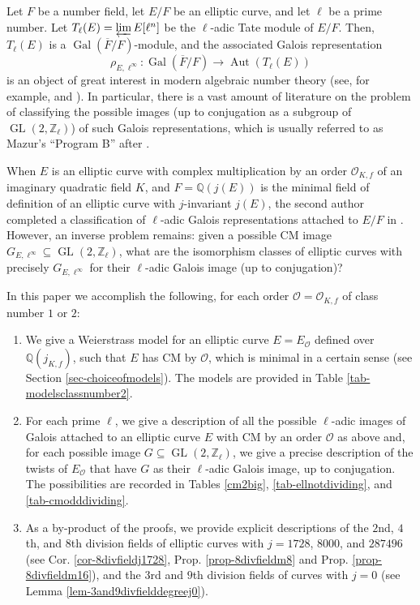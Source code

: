 \documentclass[11pt]{amsart}
\theoremstyle{definition}
\newcommand{\Q}{\mathbb Q}
\newcommand{\Z}{\mathbb Z}
\newcommand{\Gal}{\operatorname{Gal}}
\newcommand{\Aut}{\operatorname{Aut}}
\newcommand{\GL}{\operatorname{GL}}
\begin{document}
Let $F$ be a number field, let $E/F$ be an elliptic curve, and let $\ell$ be a prime number. Let $T_\ell(E)=\varprojlim E[\ell^n]$ be the $\ell$-adic Tate module of $E/F$. Then, $T_\ell(E)$ is a $\Gal(\overline{F}/F)$-module, and the associated Galois representation
$$\rho_{E,\ell^{\infty}}\colon \Gal(\overline{F}/F)\to \Aut(T_\ell(E))$$
is an object of great interest in modern algebraic number theory (see, for example, \cite{elladic} and \cite{zywina}). In particular,
there is a vast amount of literature on the problem of classifying the possible images (up to conjugation as a subgroup of $\GL(2,\Z_\ell)$) of such Galois representations, which is usually referred to as Mazur's ``Program B'' after \cite{mazurprogramb}. 

When $E$ is an elliptic curve with complex multiplication by an order $\mathcal{O}_{K,f}$ of an imaginary quadratic field $K$, and $F=\Q(j(E))$ is the minimal field of definition of an elliptic curve with $j$-invariant $j(E)$, the second author completed a classification of $\ell$-adic Galois representations attached to $E/F$ in \cite{lozano-galoiscm}. However, an inverse problem remains: given a possible CM image $G_{E,\ell^\infty}\subseteq \GL(2,\Z_\ell)$, what are the isomorphism classes of elliptic curves with precisely $G_{E,\ell^\infty}$ for their $\ell$-adic Galois image (up to conjugation)?

In this paper we accomplish the following, for each order $\mathcal{O}=\mathcal{O}_{K,f}$ of class number $1$ or $2$:
\begin{enumerate}
    \item We give a Weierstrass model for an elliptic curve $E=E_{\mathcal{O}}$ defined over $\Q(j_{K,f})$, such that $E$ has CM by $\mathcal{O}$, which is minimal in a certain sense (see Section \ref{sec-choiceofmodels}). The models are provided in Table \ref{tab-modelsclassnumber2}.
    \item For each prime $\ell$, we give a description of all the possible $\ell$-adic images of Galois attached to an elliptic curve $E$ with CM by an order $\mathcal{O}$ as above and, for each possible image $G\subseteq \GL(2,\Z_\ell)$, we give a precise description of the twists of $E_{\mathcal{O}}$ that have $G$ as their $\ell$-adic Galois image, up to conjugation. The possibilities are recorded in Tables \ref{cm2big}, \ref{tab-ellnotdividing}, 
 and \ref{tab-cmodddividing}.
    \item As a by-product of the proofs, we provide explicit descriptions of the $2$nd, $4$th, and $8$th division fields of elliptic curves with $j=1728$, $8000$, and $287496$ (see Cor. \ref{cor-8divfieldj1728}, Prop. \ref{prop-8divfieldm8} and Prop. \ref{prop-8divfieldm16}), and the $3$rd and $9$th division fields of curves with $j=0$ (see Lemma \ref{lem-3and9divfielddegreej0}).
\end{enumerate}
\end{document}
